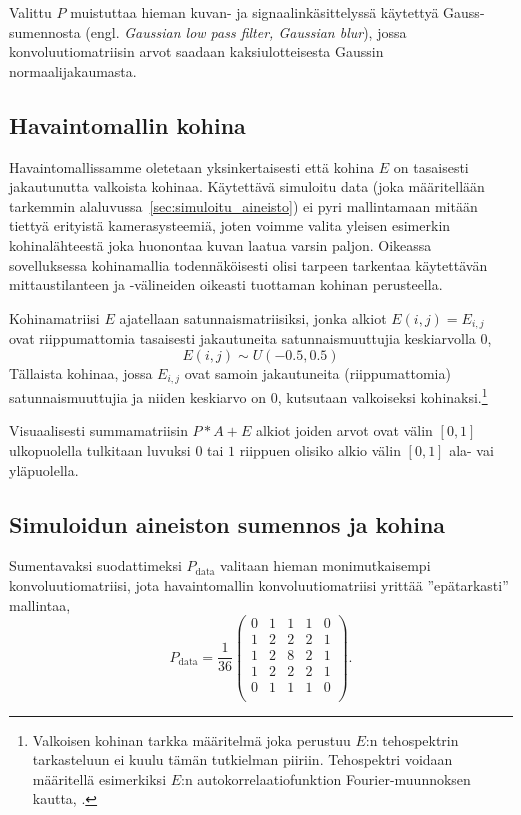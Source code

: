 Valittu $P$ muistuttaa hieman kuvan- ja signaalinkäsittelyssä käytettyä Gauss-sumennosta (engl. \emph{Gaussian low pass filter, Gaussian blur}), jossa konvoluutiomatriisin arvot saadaan kaksiulotteisesta Gaussin normaalijakaumasta.

\subsection{Havaintomallin kohina}
\label{sub:kohinamalli}

Havaintomallissamme oletetaan yksinkertaisesti että kohina $E$ on tasaisesti jakautunutta valkoista kohinaa.
Käytettävä simuloitu data (joka määritellään tarkemmin alaluvussa~\ref{sec:simuloitu_aineisto}) ei pyri mallintamaan mitään tiettyä erityistä kamerasysteemiä,
joten voimme valita yleisen esimerkin kohinalähteestä joka huonontaa kuvan laatua varsin paljon.
Oikeassa sovelluksessa kohinamallia todennäköisesti olisi tarpeen tarkentaa käytettävän mittaustilanteen ja -välineiden oikeasti tuottaman kohinan perusteella.

Kohinamatriisi $E$ ajatellaan satunnaismatriisiksi, jonka alkiot $E(i,j) = E_{i,j}$ ovat riippumattomia tasaisesti jakautuneita satunnaismuuttujia keskiarvolla 0,
\begin{equation}
    E(i,j) \sim U(-0.5, 0.5)
\end{equation}
Tällaista kohinaa, jossa $E_{i,j}$ ovat samoin jakautuneita (riippumattomia) satunnaismuuttujia ja niiden keskiarvo on 0, kutsutaan valkoiseksi kohinaksi.\footnote{Valkoisen kohinan tarkka määritelmä joka perustuu $E$:n tehospektrin  tarkasteluun ei kuulu tämän tutkielman piiriin. Tehospektri voidaan määritellä esimerkiksi $E$:n autokorrelaatiofunktion Fourier-muunnoksen kautta, \cite[ks.][s.96 -- 97]{jähne}.}

Visuaalisesti summamatriisin $P \ast A + E$ alkiot joiden arvot ovat välin $[0, 1]$ ulkopuolella tulkitaan luvuksi $0$ tai $1$ riippuen olisiko alkio välin $[0, 1]$ ala- vai yläpuolella.

\subsection{Simuloidun aineiston sumennos ja kohina}
\label{sub:simuloidun_aineiston_sumennos_ja_kohina}

Sumentavaksi suodattimeksi $P_{\text{data}}$ valitaan hieman monimutkaisempi konvoluutiomatriisi, jota havaintomallin konvoluutiomatriisi yrittää ''epätarkasti'' mallintaa,
\begin{equation}
    P_{\text{data}} =
    \frac{1}{36}
    \begin{pmatrix}
        0 & 1 & 1 & 1 & 0 \\
        1 & 2 & 2 & 2 & 1 \\
        1 & 2 & 8 & 2 & 1 \\
        1 & 2 & 2 & 2 & 1 \\
        0 & 1 & 1 & 1 & 0 \\
    \end{pmatrix}.
\end{equation}


